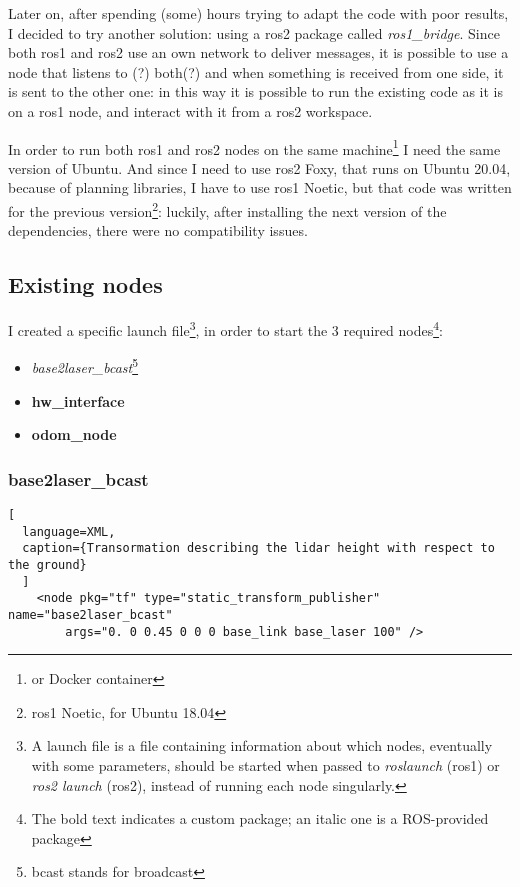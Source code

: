 Later on, after spending (some) hours trying to adapt the code with poor results, I decided to try another solution: using a \acrshort{ros}2 package called {\it ros1\_bridge}. Since both \acrshort{ros}1 and \acrshort{ros}2 use an own network to deliver messages, it is possible to use a node that listens to (?) both(?) and when something is received from one side, it is sent to the other one: in this way it is possible to run the existing code as it is on a \acrshort{ros}1 node, and interact with it from a \acrshort{ros}2 workspace.

In order to run both \acrshort{ros}1 and \acrshort{ros}2 nodes on the same machine\footnote{or Docker container} I need the same version of Ubuntu. And since I need to use \acrshort{ros}2 Foxy, that runs on Ubuntu 20.04, because of planning libraries, I have to use \acrshort{ros}1 Noetic, but that code was written for the previous version\footnote{\acrshort{ros}1 Noetic, for Ubuntu 18.04}: luckily, after installing the next version of the dependencies, there were no compatibility issues.

\subsection{Existing nodes}
\label{subsec:nodes}

I created a specific launch file\footnote{A launch file is a file containing information about which nodes, eventually with some parameters, should be started when passed to {\it roslaunch} (\acrshort{ros}1) or {\it ros2 launch} (\acrshort{ros}2), instead of running each node singularly.}, in order to start the 3 required nodes\footnote{The bold text indicates a custom package; an italic one is a ROS-provided package}:

\begin{itemize}
    \item {\it base2laser\_bcast}\footnote{bcast stands for broadcast}
    \item {\bf hw\_interface}
    \item {\bf odom\_node}
\end{itemize}

\subsubsection{base2laser\_bcast}

\begin{lstlisting}[
  language=XML,
  caption={Transormation describing the lidar height with respect to the ground}
  ]
    <node pkg="tf" type="static_transform_publisher" name="base2laser_bcast"
        args="0. 0 0.45 0 0 0 base_link base_laser 100" />
\end{lstlisting}


